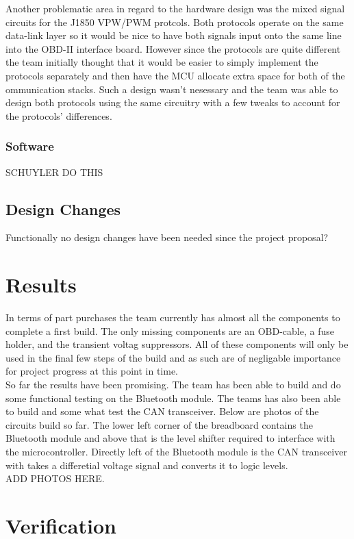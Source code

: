\documentclass[12pt,letterpaper]{article}
\begin{document}
Another problematic area in regard to the hardware design was the mixed signal circuits for the J1850 VPW/PWM protcols. Both protocols operate on the same data-link layer so it would be nice to have both signals input onto the same line into the OBD-II interface board. However since the protocols are quite different the team initially thought that it would be easier to simply implement the protocols separately and then have the MCU allocate extra space for both of the ommunication stacks. Such a design wasn't nesessary and the team was able to design both protocols using the same circuitry with a few tweaks to account for the protocols' differences.

\subsubsection{Software}
SCHUYLER DO THIS

\subsection{Design Changes}
Functionally no design changes have been needed since the project proposal?

\section{Results}
In terms of part purchases the team currently has almost all the components to complete a first build. The only missing components are an OBD-cable, a fuse holder, and the transient voltag suppressors. All of these components will only be used in the final few steps of the build and as such are of negligable importance for project progress at this point in time. \\

So far the results have been promising. The team has been able to build and do some functional testing on the Bluetooth module. The teams has also been able to build and some what test the CAN transceiver. Below are photos of the circuits build so far. The lower left corner of the breadboard contains the Bluetooth module and above that is the level shifter required to interface with the microcontroller. Directly left of the Bluetooth module is the CAN transceiver with takes a differetial voltage signal and converts it to logic levels. \\

ADD PHOTOS HERE.

\section{Verification}
\end{document}
